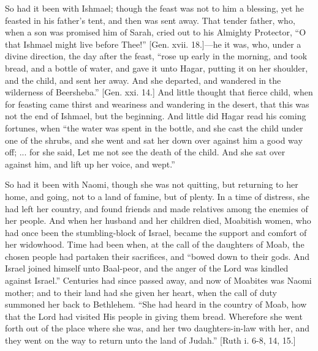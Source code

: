 So had it been with Ishmael; though the feast was not to him a
blessing, yet he feasted in his father's tent, and then was sent away.
That tender father, who, when a son was promised him of Sarah, cried
out to his Almighty Protector, ``O that Ishmael might live before
Thee!'' [Gen. xvii. 18.]—he it was, who, under a divine
direction, the day after the feast, ``rose up early in the
morning, and took bread, and a bottle of water, and gave it unto
Hagar, putting it on her shoulder, and the child, and sent her away.
And she departed, and wandered in the wilderness of Beersheba.''
[Gen. xxi. 14.] And little thought that fierce child, when for
feasting came thirst and weariness and wandering in the desert, that
this was not the end of Ishmael, but the beginning. And little did
Hagar read his coming fortunes, when ``the water was spent in the
bottle, and she cast the child under one of the shrubs, and she went
and sat her down over against him a good way off; ... for she said,
Let me not see the death of the child. And she sat over against him,
and lift up her voice, and wept.''

So had it been with Naomi, though she was not quitting, but
returning to her home, and going, not to a land of famine, but of
plenty. In a time of distress, she had left her country, and found
friends and made relatives among the enemies of her people. And when
her husband and her children died, Moabitish women, who had once been
the stumbling-block of Israel, became the support and comfort of her
widowhood. Time had been when, at the call of the daughters of Moab,
the chosen people had partaken their sacrifices, and ``bowed down
to their gods. And Israel joined himself unto Baal-peor, and the anger
of the Lord was kindled against Israel.'' Centuries had since
passed away, and now of Moabites was Naomi mother; and to their land
had she given her heart, when the call of duty summoned her back to
Bethlehem. ``She had heard in the country of Moab, how that the
Lord had visited His people in giving them bread. Wherefore she went
forth out of the place where she was, and her two daughters-in-law
with her, and they went on the way to return unto the land of
Judah.'' [Ruth i. 6-8, 14, 15.]

